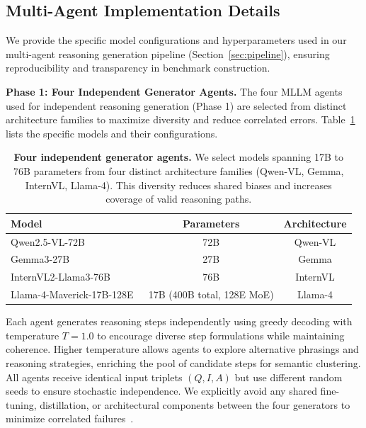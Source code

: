 
\subsection{Multi-Agent Implementation Details}
\label{sec:implementation_details}

We provide the specific model configurations and hyperparameters used in our multi-agent reasoning generation pipeline (Section~\ref{sec:pipeline}), ensuring reproducibility and transparency in benchmark construction.

\textbf{Phase 1: Four Independent Generator Agents.}
The four MLLM agents used for independent reasoning generation (Phase 1) are selected from distinct architecture families to maximize diversity and reduce correlated errors. Table~\ref{tab:generator_agents} lists the specific models and their configurations.

\begin{table}[h]
\centering
\small
\begin{tabular}{@{}lcc@{}}
\toprule
\textbf{Model} & \textbf{Parameters} & \textbf{Architecture} \\
\midrule
Qwen2.5-VL-72B~\cite{qwen2vl2024} & 72B & Qwen-VL \\
Gemma3-27B~\cite{gemma2024} & 27B & Gemma \\
InternVL2-Llama3-76B~\cite{internvl2} & 76B & InternVL \\
Llama-4-Maverick-17B-128E~\cite{llama4} & 17B (400B total, 128E MoE) & Llama-4 \\
\bottomrule
\end{tabular}
\caption{\textbf{Four independent generator agents.} We select models spanning 17B to 76B parameters from four distinct architecture families (Qwen-VL, Gemma, InternVL, Llama-4). This diversity reduces shared biases and increases coverage of valid reasoning paths.}
\label{tab:generator_agents}
\end{table}

Each agent generates reasoning steps independently using greedy decoding with temperature $T=1.0$ to encourage diverse step formulations while maintaining coherence. Higher temperature allows agents to explore alternative phrasings and reasoning strategies, enriching the pool of candidate steps for semantic clustering. All agents receive identical input triplets $(Q, I, A)$ but use different random seeds to ensure stochastic independence. We explicitly avoid any shared fine-tuning, distillation, or architectural components between the four generators to minimize correlated failures~\cite{krogh1995neural,breiman1996bagging}.

